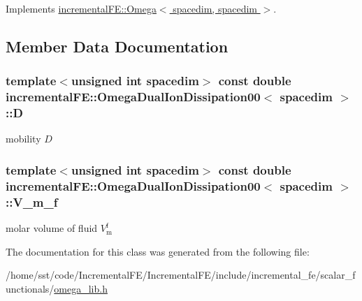 Implements \hyperlink{classincremental_f_e_1_1_omega_3_01spacedim_00_01spacedim_01_4_a40131354ef0a28ca48a0e6c9ed33aa33}{incremental\+F\+E\+::\+Omega$<$ spacedim, spacedim $>$}.



\subsection{Member Data Documentation}
\subsubsection[{\texorpdfstring{D}{D}}]{\setlength{\rightskip}{0pt plus 5cm}template$<$unsigned int spacedim$>$ const double {\bf incremental\+F\+E\+::\+Omega\+Dual\+Ion\+Dissipation00}$<$ spacedim $>$\+::D\hspace{0.3cm}{\ttfamily [private]}}\hypertarget{classincremental_f_e_1_1_omega_dual_ion_dissipation00_a8713950f83453f5b85bfa03ffe330c68}{}\label{classincremental_f_e_1_1_omega_dual_ion_dissipation00_a8713950f83453f5b85bfa03ffe330c68}
mobility $D$ 
\subsubsection[{\texorpdfstring{V\+\_\+m\+\_\+f}{V_m_f}}]{\setlength{\rightskip}{0pt plus 5cm}template$<$unsigned int spacedim$>$ const double {\bf incremental\+F\+E\+::\+Omega\+Dual\+Ion\+Dissipation00}$<$ spacedim $>$\+::V\+\_\+m\+\_\+f\hspace{0.3cm}{\ttfamily [private]}}\hypertarget{classincremental_f_e_1_1_omega_dual_ion_dissipation00_aeb60e6ba6608a34cdebbbdce600960bf}{}\label{classincremental_f_e_1_1_omega_dual_ion_dissipation00_aeb60e6ba6608a34cdebbbdce600960bf}
molar volume of fluid $V^\mathrm{f}_\mathrm{m}$ 

The documentation for this class was generated from the following file\+:\begin{DoxyCompactItemize}
\item 
/home/sst/code/\+Incremental\+F\+E/\+Incremental\+F\+E/include/incremental\+\_\+fe/scalar\+\_\+functionals/\hyperlink{omega__lib_8h}{omega\+\_\+lib.\+h}\end{DoxyCompactItemize}
